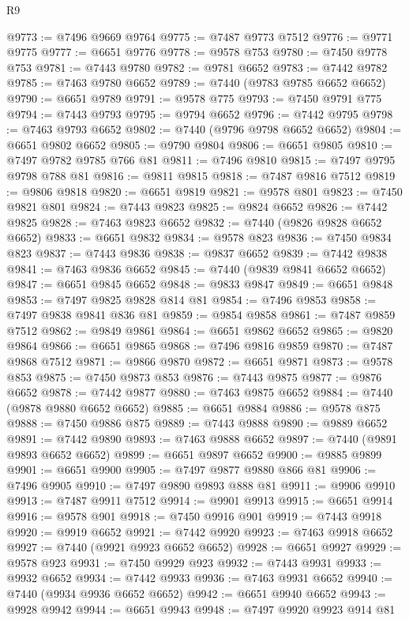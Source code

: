 \begin{lexlean}{R9}
\begin{coremodule}
{{{{{{{{{{{{{{{{{{{{{{{{{{{{{{{{{{{{{{{{{{{{{{{{{{{{{{{{{{{{{{{{{{{{{{{{{{{{{{{{{{{{@9773 := @7496 @9669 @9764
@9775 := @7487 @9773 @7512
@9776 := @9771 @9775
@9777 := @6651 @9776
@9778 := @9578 @753
@9780 := @7450 @9778 @753
@9781 := @7443 @9780
@9782 := @9781 @6652
@9783 := @7442 @9782
@9785 := @7463 @9780 @6652
@9789 := @7440 (@9783 @9785 @6652 @6652)
@9790 := @6651 @9789
@9791 := @9578 @775
@9793 := @7450 @9791 @775
@9794 := @7443 @9793
@9795 := @9794 @6652
@9796 := @7442 @9795
@9798 := @7463 @9793 @6652
@9802 := @7440 (@9796 @9798 @6652 @6652)
@9804 := @6651 @9802 @6652
@9805 := @9790 @9804
@9806 := @6651 @9805
@9810 := @7497 @9782 @9785 @766 @81
@9811 := @7496 @9810
@9815 := @7497 @9795 @9798 @788 @81
@9816 := @9811 @9815
@9818 := @7487 @9816 @7512
@9819 := @9806 @9818
@9820 := @6651 @9819
@9821 := @9578 @801
@9823 := @7450 @9821 @801
@9824 := @7443 @9823
@9825 := @9824 @6652
@9826 := @7442 @9825
@9828 := @7463 @9823 @6652
@9832 := @7440 (@9826 @9828 @6652 @6652)
@9833 := @6651 @9832
@9834 := @9578 @823
@9836 := @7450 @9834 @823
@9837 := @7443 @9836
@9838 := @9837 @6652
@9839 := @7442 @9838
@9841 := @7463 @9836 @6652
@9845 := @7440 (@9839 @9841 @6652 @6652)
@9847 := @6651 @9845 @6652
@9848 := @9833 @9847
@9849 := @6651 @9848
@9853 := @7497 @9825 @9828 @814 @81
@9854 := @7496 @9853
@9858 := @7497 @9838 @9841 @836 @81
@9859 := @9854 @9858
@9861 := @7487 @9859 @7512
@9862 := @9849 @9861
@9864 := @6651 @9862 @6652
@9865 := @9820 @9864
@9866 := @6651 @9865
@9868 := @7496 @9816 @9859
@9870 := @7487 @9868 @7512
@9871 := @9866 @9870
@9872 := @6651 @9871
@9873 := @9578 @853
@9875 := @7450 @9873 @853
@9876 := @7443 @9875
@9877 := @9876 @6652
@9878 := @7442 @9877
@9880 := @7463 @9875 @6652
@9884 := @7440 (@9878 @9880 @6652 @6652)
@9885 := @6651 @9884
@9886 := @9578 @875
@9888 := @7450 @9886 @875
@9889 := @7443 @9888
@9890 := @9889 @6652
@9891 := @7442 @9890
@9893 := @7463 @9888 @6652
@9897 := @7440 (@9891 @9893 @6652 @6652)
@9899 := @6651 @9897 @6652
@9900 := @9885 @9899
@9901 := @6651 @9900
@9905 := @7497 @9877 @9880 @866 @81
@9906 := @7496 @9905
@9910 := @7497 @9890 @9893 @888 @81
@9911 := @9906 @9910
@9913 := @7487 @9911 @7512
@9914 := @9901 @9913
@9915 := @6651 @9914
@9916 := @9578 @901
@9918 := @7450 @9916 @901
@9919 := @7443 @9918
@9920 := @9919 @6652
@9921 := @7442 @9920
@9923 := @7463 @9918 @6652
@9927 := @7440 (@9921 @9923 @6652 @6652)
@9928 := @6651 @9927
@9929 := @9578 @923
@9931 := @7450 @9929 @923
@9932 := @7443 @9931
@9933 := @9932 @6652
@9934 := @7442 @9933
@9936 := @7463 @9931 @6652
@9940 := @7440 (@9934 @9936 @6652 @6652)
@9942 := @6651 @9940 @6652
@9943 := @9928 @9942
@9944 := @6651 @9943
@9948 := @7497 @9920 @9923 @914 @81
}}}}}}}}}}}}}}}}}}}}}}}}}}}}}}}}}}}}}}}}}}}}}}}}}}}}}}}}}}}}}}}}}}}}}}}}}}}}}}}}}}}}
\end{coremodule}
\end{lexlean}
